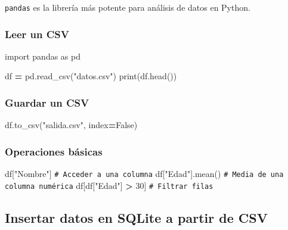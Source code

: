 \documentclass[
]{book}
\newenvironment{Shaded}{\begin{snugshade}}{\end{snugshade}}
\newcommand{\BuiltInTok}[1]{#1}
\newcommand{\CommentTok}[1]{\textcolor[rgb]{0.56,0.35,0.01}{\textit{#1}}}
\newcommand{\DecValTok}[1]{\textcolor[rgb]{0.00,0.00,0.81}{#1}}
\newcommand{\ImportTok}[1]{#1}
\newcommand{\NormalTok}[1]{#1}
\newcommand{\OperatorTok}[1]{\textcolor[rgb]{0.81,0.36,0.00}{\textbf{#1}}}
\newcommand{\StringTok}[1]{\textcolor[rgb]{0.31,0.60,0.02}{#1}}
\newcommand{\VariableTok}[1]{\textcolor[rgb]{0.00,0.00,0.00}{#1}}
\theoremstyle{break}
\theoremstyle{nonumberplain}
\renewcommand{\CommentTok}[1]{\textcolor[rgb]{0.41,0.41,0.41}{\texttt{#1}}}
\begin{document}
\texttt{pandas} es la librería más potente para análisis de datos en Python.

\subsubsection{Leer un CSV}\label{leer-un-csv}

\begin{Shaded}
\begin{Highlighting}[]
\ImportTok{import}\NormalTok{ pandas }\ImportTok{as}\NormalTok{ pd}

\NormalTok{df }\OperatorTok{=}\NormalTok{ pd.read\_csv(}\StringTok{"datos.csv"}\NormalTok{)}
\BuiltInTok{print}\NormalTok{(df.head())}
\end{Highlighting}
\end{Shaded}

\subsubsection{Guardar un CSV}\label{guardar-un-csv}

\begin{Shaded}
\begin{Highlighting}[]
\NormalTok{df.to\_csv(}\StringTok{"salida.csv"}\NormalTok{, index}\OperatorTok{=}\VariableTok{False}\NormalTok{)}
\end{Highlighting}
\end{Shaded}

\subsubsection{Operaciones básicas}\label{operaciones-buxe1sicas}

\begin{Shaded}
\begin{Highlighting}[]
\NormalTok{df[}\StringTok{"Nombre"}\NormalTok{]                }\CommentTok{\# Acceder a una columna}
\NormalTok{df[}\StringTok{"Edad"}\NormalTok{].mean()           }\CommentTok{\# Media de una columna numérica}
\NormalTok{df[df[}\StringTok{"Edad"}\NormalTok{] }\OperatorTok{\textgreater{}} \DecValTok{30}\NormalTok{]         }\CommentTok{\# Filtrar filas}
\end{Highlighting}
\end{Shaded}

\subsection{Insertar datos en SQLite a partir de CSV}\label{insertar-datos-en-sqlite-a-partir-de-csv}
\end{document}
